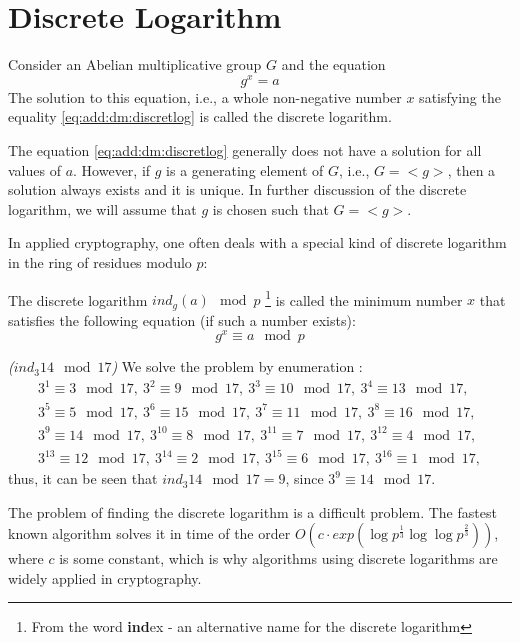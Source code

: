 \section{Discrete Logarithm}
\label{AddDiscretLog}

\begin{definition}
Consider an Abelian multiplicative group $G$ and the equation 
\begin{equation}
g^x = a
\label{eq:add:dm:discretlog}
\end{equation}
The solution to this equation, i.e., a whole non-negative number $x$
satisfying the equality \eqref{eq:add:dm:discretlog} is called
the discrete logarithm.
\end{definition}

The equation \eqref{eq:add:dm:discretlog} generally does not have a solution for all values of $a$. However, if $g$ is a generating
element of $G$, i.e., $G=<g>$, then a solution always exists and it is
unique. In further discussion of the discrete logarithm, we will
assume that $g$ is chosen such that $G=<g>$.

In applied cryptography, one often deals with a special kind of
discrete logarithm in the ring of residues modulo $p$:
\begin{definition}
The discrete logarithm $ind_g\left(a\right) \mod{p}$
\footnote{From the word {\bf ind}ex - an alternative name for the discrete logarithm}
is called
the minimum number $x$ that satisfies the following equation
(if such a number exists): 
\begin{equation}
g^x \equiv a \mod{p}
\end{equation}
\end{definition}

\begin{example}
\emph{($ind_3{14} \mod{17}$)}
We solve the problem by enumeration \cite{bWikiDiscretLog}:
\begin{eqnarray}
3^1 \equiv 3 \mod{17},\: 
3^2 \equiv 9 \mod{17},\: 
3^3 \equiv 10 \mod{17},\:
3^4 \equiv 13 \mod{17}, 
\nonumber \\
3^5 \equiv 5 \mod{17},\: 
3^6 \equiv 15 \mod{17},\: 
3^7 \equiv 11 \mod{17},\: 
3^8 \equiv 16 \mod{17}, 
\nonumber \\
3^9 \equiv 14 \mod{17},\: 
3^{10} \equiv 8 \mod{17},\: 
3^{11} \equiv 7 \mod{17},\: 
3^{12} \equiv 4 \mod{17}, 
\nonumber \\
3^{13} \equiv 12 \mod{17},\: 
3^{14} \equiv 2 \mod{17},\:
3^{15} \equiv 6 \mod{17},\: 
3^{16} \equiv 1 \mod{17},
\nonumber
\end{eqnarray}
thus, it can be seen that $ind_3{14} \mod{17} = 9$, 
since $3^9 \equiv 14 \mod{17}$. 
\label{ex:dm:discretlog}
\end{example}

The problem of finding the discrete logarithm is a difficult
problem. The fastest known algorithm
\cite{bGordon93discretelogarithms} solves it in time of the order 
\(
O\left(c \cdot
exp\left(\log{p}^{\frac{1}{3}}\log{\log{p}}^{\frac{2}{3}}
\right)\right)
\), where $c$ is some constant,
which is why algorithms using
discrete logarithms are widely applied in cryptography.